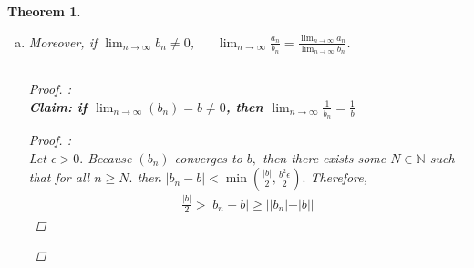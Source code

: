 \documentclass[openany, amssymb, psamsfonts]{amsart}
\newcommand{\bbN}{\mathbb{N}}
\newtheorem{thm}{Theorem}[section]
\theoremstyle{definition}
\numberwithin{equation}{section}
\begin{document}
\begin{thm}
\begin{enumerate}[(a)]
\begin{proof}
\begin{enumerate}
  \item There exists some $N_b \in \bbN$ such that if $n>N_b,$ $|b_n - b|< \frac{\epsilon}{|b| + |a|+1}.$
  \item There exists some $N_0 \in \bbN$ such that if $n>N_0,$ $|a_n - a|< 1.$\footnote{If $|a_n - a|<1,$ then $|a_n|< |a|+1$ \begin{proof} Because $|a_n - a|< 1,$ then $a -1< a_n < a+1.$ If $|a_n|<0,$ then $|a_n|< |a-1|\leq |a| + 1.$ If $|a_n\geq 0,$ then $|a_n|< |a+1|= |a| + 1.$\end{proof}}
  \end{enumerate}
  Therefore, let $N = \max(N_a, N_b, N_0),$ and thus for all $\epsilon>0:$
  \begin{align*}
  |a_nb_n - ab| &= |a_nb_n + a_nb - a_nb -ab|\\
  &= |a_n(b_n - b) + b(a_n - a)|\\
  &\leq |a_n(b_n - b)| + |b(a_n - a)|\\
  &= |a_n||(b_n - b)| + |b||(a_n - a)|\\
  &< |a_n|\frac{\epsilon}{|b| + |a|+1} + |b|\frac{\epsilon}{|b| + |a|+1}\\
  &<\epsilon(\frac{|a_n| + |b|}{|b|+|a|+1})\\
\tag{footnote 7}  &< \epsilon(\frac{|b| + |a| + 1}{|b| + |a| + 1})\\
  &= \epsilon
  \end{align*}
  \end{proof}\vspace{4pt}     \hrule   \vspace{4pt}
	\item Moreover, if $\displaystyle\lim_{n\to \infty} b_n\neq 0$, $\quad$ $\displaystyle\lim_{n\to \infty}\displaystyle\frac{a_n}{b_n}= \frac{\displaystyle\lim_{n\to \infty}a_n}{\displaystyle\lim_{n\to \infty} b_n}$.
 \vspace{4pt}     \hrule   \vspace{4pt} \begin{proof}:\\
\textbf{Claim: if $\displaystyle\lim_{n\to \infty}(b_n) = b\neq 0$, then $\displaystyle\lim_{n\to \infty}\frac{1}{b_n} = \displaystyle\frac{1}{b}$}
\begin{proof}:\\
Let $\epsilon>0.$  Because $(b_n)$ converges to $b,$ then there exists some $N \in \bbN$ such that for all $n\geq N.$ then $|b_n - b|< \min(\frac{|b|}{2}, \frac{b^2\epsilon}{2}).$ Therefore, 
\begin{align*}
\frac{|b|}{2} > |b_n - b|\geq ||b_n| - |b|| 

\end{align*}
\end{proof}
\end{proof}
\end{enumerate}
\end{thm}
\end{document}

